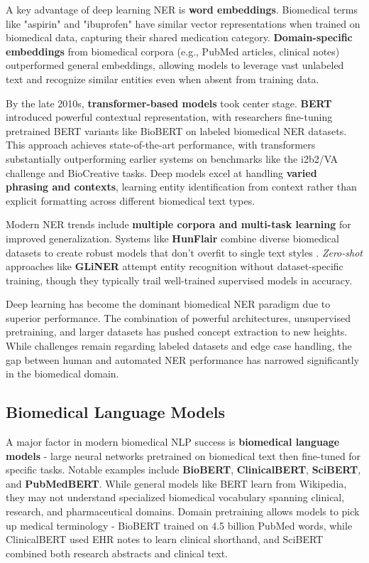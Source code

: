 A key advantage of deep learning NER is \textbf{word embeddings}. Biomedical terms like "aspirin" and "ibuprofen" have similar vector representations when trained on biomedical data, capturing their shared medication category. \textbf{Domain-specific embeddings} from biomedical corpora (e.g., PubMed articles, clinical notes) outperformed general embeddings, allowing models to leverage vast unlabeled text and recognize similar entities even when absent from training data.

By the late 2010s, \textbf{transformer-based models} took center stage. \textbf{BERT} introduced powerful contextual representation, with researchers fine-tuning pretrained BERT variants like BioBERT on labeled biomedical NER datasets. This approach achieves state-of-the-art performance, with transformers substantially outperforming earlier systems on benchmarks like the i2b2/VA challenge and BioCreative tasks. Deep models excel at handling \textbf{varied phrasing and contexts}, learning entity identification from context rather than explicit formatting across different biomedical text types.

Modern NER trends include \textbf{multiple corpora and multi-task learning} for improved generalization. Systems like \textbf{HunFlair} combine diverse biomedical datasets to create robust models that don't overfit to single text styles \parencite{Weber2023}. \emph{Zero-shot} approaches like \textbf{GLiNER} attempt entity recognition without dataset-specific training, though they typically trail well-trained supervised models in accuracy.

Deep learning has become the dominant biomedical NER paradigm due to superior performance. The combination of powerful architectures, unsupervised pretraining, and larger datasets has pushed concept extraction to new heights. While challenges remain regarding labeled datasets and edge case handling, the gap between human and automated NER performance has narrowed significantly in the biomedical domain.

\subsection{Biomedical Language Models}

A major factor in modern biomedical NLP success is \textbf{biomedical language models} - large neural networks pretrained on biomedical text then fine-tuned for specific tasks. Notable examples include \textbf{BioBERT}, \textbf{ClinicalBERT}, \textbf{SciBERT}, and \textbf{PubMedBERT}. While general models like BERT learn from Wikipedia, they may not understand specialized biomedical vocabulary spanning clinical, research, and pharmaceutical domains. Domain pretraining allows models to pick up medical terminology - BioBERT trained on 4.5 billion PubMed words, while ClinicalBERT used EHR notes to learn clinical shorthand, and SciBERT combined both research abstracts and clinical text.

